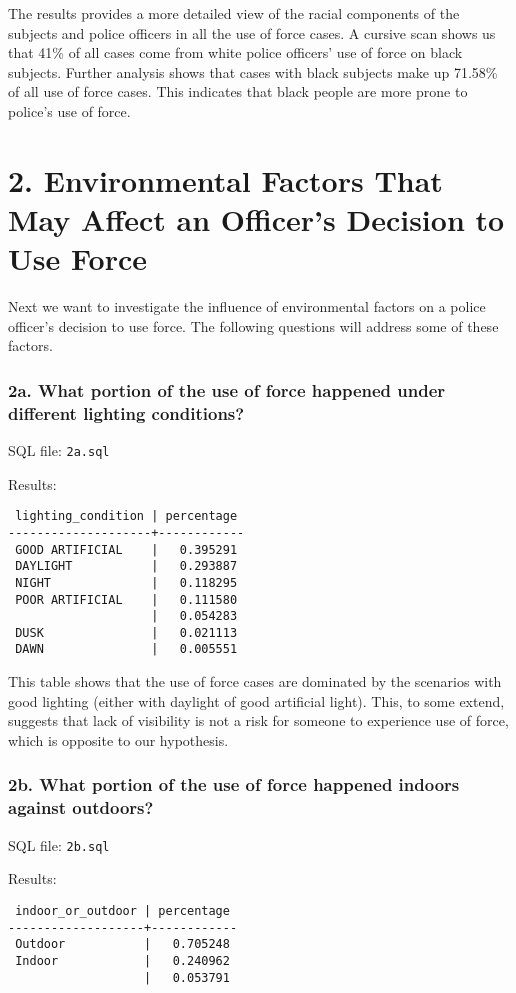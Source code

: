 \documentclass[10pt]{article}
\begin{document}
The results provides a more detailed view of the racial components of the subjects and police officers in all the use of force cases. A cursive scan shows us that 41\% of all cases come from white police officers' use of force on black subjects. Further analysis shows that cases with black subjects make up 71.58\% of all use of force cases. This indicates that black people are more prone to police's use of force.


\section*{2. Environmental Factors That May Affect an Officer’s Decision to Use Force}

Next we want to investigate the influence of environmental factors on a police officer's decision to use force. The following questions will address some of these factors.

\subsubsection*{2a. What portion of the use of force happened under different lighting conditions?}

SQL file: \texttt{2a.sql}

Results:

\begin{verbatim}
 lighting_condition | percentage
--------------------+------------
 GOOD ARTIFICIAL    |   0.395291
 DAYLIGHT           |   0.293887
 NIGHT              |   0.118295
 POOR ARTIFICIAL    |   0.111580
                    |   0.054283
 DUSK               |   0.021113
 DAWN               |   0.005551
\end{verbatim}

This table shows that the use of force cases are dominated by the scenarios with good lighting (either with daylight of good artificial light). This, to some extend, suggests that lack of visibility is not a risk for someone to experience use of force, which is opposite to our hypothesis.

\subsubsection*{2b. What portion of the use of force happened indoors against outdoors?}

SQL file: \texttt{2b.sql}

Results:

\begin{verbatim}
 indoor_or_outdoor | percentage
-------------------+------------
 Outdoor           |   0.705248
 Indoor            |   0.240962
                   |   0.053791
\end{verbatim}
\end{document}
